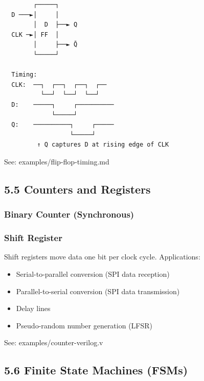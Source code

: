 \documentclass[11pt,a4paper]{book}
\begin{document}
\begin{lstlisting}
        ┌─────┐
  D ───►│     │
        │  D  ├──► Q
  CLK ─►│ FF  │
        │     ├──► Q̄
        └─────┘
  
  Timing:
  CLK:  ──┐  ┌──┐  ┌──┐  ┌──
          └──┘  └──┘  └──┘
  D:    ─────┐     ┌──────────
             └─────┘
  Q:    ──────────┐     ┌─────
                  └─────┘
         ↑ Q captures D at rising edge of CLK
\end{lstlisting}

See: examples/flip-flop-timing.md

\medskip\noindent\hrulefill\medskip

\subsection{5.5 Counters and Registers}

\subsubsection{Binary Counter (Synchronous)}

\subsubsection{Shift Register}

Shift registers move data one bit per clock cycle. Applications:
\begin{itemize}
\item Serial-to-parallel conversion (SPI data reception)
\item Parallel-to-serial conversion (SPI data transmission)
\item Delay lines
\item Pseudo-random number generation (LFSR)
\end{itemize}

See: examples/counter-verilog.v

\medskip\noindent\hrulefill\medskip

\subsection{5.6 Finite State Machines (FSMs)}
\end{document}
